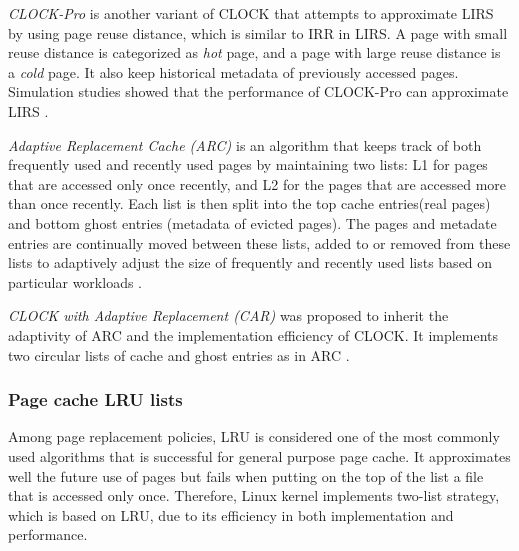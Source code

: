 \textit{CLOCK-Pro} is another variant of CLOCK that attempts to approximate 
LIRS by using page reuse distance, which is similar to IRR in LIRS. 
A page with small reuse distance is categorized as \textit{hot} page, 
and a page with large reuse distance is a \textit{cold} page. It also keep 
historical metadata of previously accessed pages. Simulation studies showed 
that the performance of CLOCK-Pro can approximate LIRS 
\cite{chavan2011comparison}. 

\textit{Adaptive Replacement Cache (ARC)} is an algorithm that keeps track of
both frequently used and recently used pages by maintaining two lists: 
L1 for pages that are accessed only once recently, and L2 for the pages 
that are accessed more than once recently. 
Each list is then split into the top cache entries(real pages) and bottom 
ghost entries (metadata of evicted pages). 
The pages and metadate entries are continually moved between these lists, 
added to or removed from these lists to adaptively adjust the size 
of frequently and recently used lists based on particular workloads  
\cite{chavan2011comparison}. 

\textit{CLOCK with Adaptive Replacement (CAR)} was proposed to inherit 
the adaptivity of ARC and the implementation efficiency of CLOCK.  
It implements two circular lists of cache and ghost entries as in ARC 
\cite{chavan2011comparison}. 

\subsubsection{Page cache LRU lists}

Among page replacement policies, LRU is considered one of the most commonly 
used algorithms that is successful for general purpose page cache. 
It approximates well the future use of pages but fails when putting on the 
top of the list a file that is accessed only once. 
Therefore, Linux kernel implements two-list strategy, which is based on LRU, 
due to its efficiency in both implementation and performance. 

